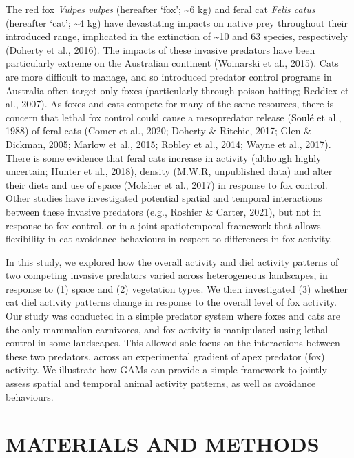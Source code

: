 \documentclass[]{elsarticle} %
\begin{document}
The red fox \emph{Vulpes vulpes} (hereafter `fox'; \textasciitilde6 kg) and feral cat \emph{Felis catus} (hereafter `cat'; \textasciitilde4 kg) have devastating impacts on native prey throughout their introduced range, implicated in the extinction of \textasciitilde10 and 63 species, respectively (Doherty et al., 2016). The impacts of these invasive predators have been particularly extreme on the Australian continent (Woinarski et al., 2015). Cats are more difficult to manage, and so introduced predator control programs in Australia often target only foxes (particularly through poison-baiting; Reddiex et al., 2007). As foxes and cats compete for many of the same resources, there is concern that lethal fox control could cause a mesopredator release (Soulé et al., 1988) of feral cats (Comer et al., 2020; Doherty \& Ritchie, 2017; Glen \& Dickman, 2005; Marlow et al., 2015; Robley et al., 2014; Wayne et al., 2017). There is some evidence that feral cats increase in activity (although highly uncertain; Hunter et al., 2018), density (M.W.R, unpublished data) and alter their diets and use of space (Molsher et al., 2017) in response to fox control. Other studies have investigated potential spatial and temporal interactions between these invasive predators (e.g., Roshier \& Carter, 2021), but not in response to fox control, or in a joint spatiotemporal framework that allows flexibility in cat avoidance behaviours in respect to differences in fox activity.

In this study, we explored how the overall activity and diel activity patterns of two competing invasive predators varied across heterogeneous landscapes, in response to (1) space and (2) vegetation types. We then investigated (3) whether cat diel activity patterns change in response to the overall level of fox activity. Our study was conducted in a simple predator system where foxes and cats are the only mammalian carnivores, and fox activity is manipulated using lethal control in some landscapes. This allowed sole focus on the interactions between these two predators, across an experimental gradient of apex predator (fox) activity. We illustrate how GAMs can provide a simple framework to jointly assess spatial and temporal animal activity patterns, as well as avoidance behaviours.

\newpage

\hypertarget{materials-and-methods}{%
\section{MATERIALS AND METHODS}\label{materials-and-methods}}
\end{document}
